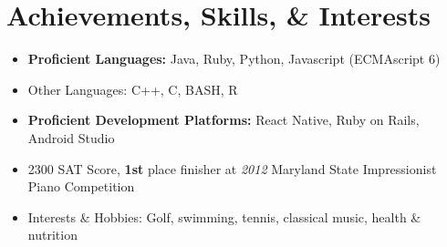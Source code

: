 \documentclass[11pt,letterpaper,calibri]{moderncv}        %
\begin{document}

\section{Achievements, Skills, \& Interests}

\begin{itemize}[leftmargin=0.2in]
\setlength\itemsep{-3pt}
\item \textbf{Proficient Languages:} Java, Ruby, Python, Javascript (ECMAscript 6)
\item Other Languages: C++, C, BASH, R
\item \textbf{Proficient Development Platforms:} React Native, Ruby on Rails, Android Studio
\item 2300 SAT Score, \textbf{1st} place finisher at \textit{2012} Maryland State Impressionist Piano Competition
\item Interests \& Hobbies: Golf, swimming, tennis, classical music, health \& nutrition

\end{itemize}
\end{document}

